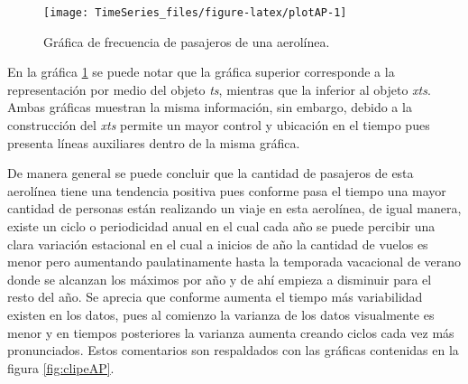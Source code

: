 \documentclass[
  spanish,
]{book}
\theoremstyle{remark}
\begin{document}
\begin{figure}

{\centering \texttt{[image: TimeSeries\_files/figure-latex/plotAP-1]} 

}

\caption{Gráfica de frecuencia de pasajeros de una aerolínea.}\label{fig:plotAP}
\end{figure}

En la gráfica \ref{fig:plotAP} se puede notar que la gráfica superior corresponde a la representación por medio del objeto \emph{ts}, mientras que la inferior al objeto \emph{xts}. Ambas gráficas muestran la misma información, sin embargo, debido a la construcción del \emph{xts} permite un mayor control y ubicación en el tiempo pues presenta líneas auxiliares dentro de la misma gráfica.

De manera general se puede concluir que la cantidad de pasajeros de esta aerolínea tiene una tendencia positiva pues conforme pasa el tiempo una mayor cantidad de personas están realizando un viaje en esta aerolínea, de igual manera, existe un ciclo o periodicidad anual en el cual cada año se puede percibir una clara variación estacional en el cual a inicios de año la cantidad de vuelos es menor pero aumentando paulatinamente hasta la temporada vacacional de verano donde se alcanzan los máximos por año y de ahí empieza a disminuir para el resto del año. Se aprecia que conforme aumenta el tiempo más variabilidad existen en los datos, pues al comienzo la varianza de los datos visualmente es menor y en tiempos posteriores la varianza aumenta creando ciclos cada vez más pronunciados. Estos comentarios son respaldados con las gráficas contenidas en la figura \ref{fig:clipeAP}.
\end{document}
